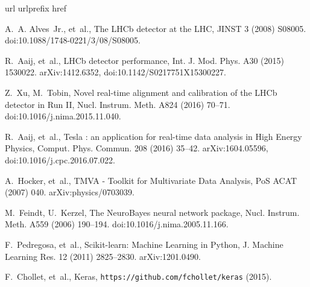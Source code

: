 \documentclass[final,5p,times,twocolumn]{elsarticle}
\def\lhcb {\mbox{LHCb}\xspace}
\begin{document}
%
%
\begin{thebibliography}{10}
\expandafter\ifx\csname url\endcsname\relax
  \def\url#1{\texttt{#1}}\fi
\expandafter\ifx\csname urlprefix\endcsname\relax\def\urlprefix{URL }\fi
\expandafter\ifx\csname href\endcsname\relax
  \def\href#1#2{#2} \def\path#1{#1}\fi

A.~A. Alves~Jr., et~al., {The \lhcb detector at the LHC}, JINST 3 (2008)
  S08005.
\newblock \href {http://dx.doi.org/10.1088/1748-0221/3/08/S08005}
  {\path{doi:10.1088/1748-0221/3/08/S08005}}.

R.~Aaij, et~al., {LHCb detector performance}, Int. J. Mod. Phys. A30 (2015)
  1530022.
\newblock \href {http://arxiv.org/abs/1412.6352} {\path{arXiv:1412.6352}},
  \href {http://dx.doi.org/10.1142/S0217751X15300227}
  {\path{doi:10.1142/S0217751X15300227}}.

Z.~Xu, M.~Tobin, {Novel real-time alignment and calibration of the LHCb
  detector in Run II}, Nucl. Instrum. Meth. A824 (2016) 70--71.
\newblock \href {http://dx.doi.org/10.1016/j.nima.2015.11.040}
  {\path{doi:10.1016/j.nima.2015.11.040}}.

R.~Aaij, et~al., {Tesla : an application for real-time data analysis in High
  Energy Physics}, Comput. Phys. Commun. 208 (2016) 35--42.
\newblock \href {http://arxiv.org/abs/1604.05596} {\path{arXiv:1604.05596}},
  \href {http://dx.doi.org/10.1016/j.cpc.2016.07.022}
  {\path{doi:10.1016/j.cpc.2016.07.022}}.

A.~Hocker, et~al., {TMVA - Toolkit for Multivariate Data Analysis}, PoS ACAT
  (2007) 040.
\newblock \href {http://arxiv.org/abs/physics/0703039}
  {\path{arXiv:physics/0703039}}.

M.~Feindt, U.~Kerzel, {The NeuroBayes neural network package}, Nucl. Instrum.
  Meth. A559 (2006) 190--194.
\newblock \href {http://dx.doi.org/10.1016/j.nima.2005.11.166}
  {\path{doi:10.1016/j.nima.2005.11.166}}.

F.~Pedregosa, et~al., {Scikit-learn: Machine Learning in Python}, J. Machine
  Learning Res. 12 (2011) 2825--2830.
\newblock \href {http://arxiv.org/abs/1201.0490} {\path{arXiv:1201.0490}}.

F.~Chollet, et~al., Keras, \url{https://github.com/fchollet/keras} (2015).


\end{thebibliography}
\end{document}
